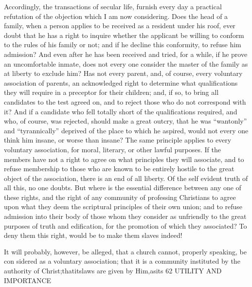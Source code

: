 \documentclass[
]{book}
\begin{document}
Accordingly, the transactions of secular life, furnish every day a practical refutation of the objection which I am now considering. Does the head of a family, when a person applies to be received as a resident under his roof, ever doubt that he has a right to inquire whether the applicant be willing to conform to the rules of his family or not; and if he decline this conformity, to refuse him admission? And even after he has been received and tried, for a while, if he prove an uncomfortable inmate, does not every one consider the master of the family as at liberty to exclude him? Has not every parent, and, of course, every voluntary association of parents, an acknowledged right to determine what qualifications they will require in a preceptor for their children; and, if so, to bring all candidates to the test agreed on, and to reject those who do not correspond with it? And if a candidate who fell totally short of the qualifications required, and who, of course, was rejected, should make a great outcry, that he was ``wantonly'' and ``tyrannically'' deprived of the place to which he aspired, would not every one think him insane, or worse than insane? The same principle applies to every voluntary association, for moral, literary, or other lawful purposes. If the members have not a right to agree on what principles they will associate, and to refuse membership to those who are known to be entirely hostile to the great object of the association, there is an end of all liberty. Of the self evident truth of all this, no one doubts. But where is the essential difference between any one of these rights, and the right of any community of professing Christians to agree upon what they deem the scriptural principles of their own union; and to refuse admission into their body of those whom they consider as unfriendly to the great purposes of truth and edification, for the promotion of which they associated? To deny them this right, would be to make them slaves indeed!

It will probably, however, be alleged, that a church cannot, properly speaking, be con sidered as a voluntary association; that it is a community instituted by the authority of Christ;thatitslaws are given by Him,asits
62
UTILITY AND IMPORTANCE
\end{document}
